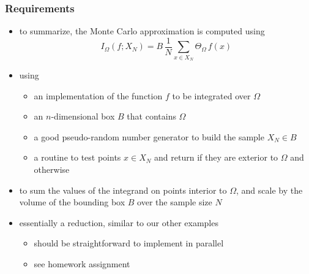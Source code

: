 \begin{frame}[fragile]
%
  \frametitle{Requirements}
%
  \begin{itemize}
%
  \item to summarize, the Monte Carlo approximation is computed using
%
    \begin{equation}
      I_{\Omega} (f; X_{N})
      =
      B \, \frac{1}{N} \sum_{x \in X_{N}} \Theta_{\Omega} \, f(x)
    \end{equation}
%
  \item using
    \begin{itemize}
    \item an implementation of the function $f$ to be integrated over $\Omega$
    \item an $n$-dimensional box $B$ that contains $\Omega$
    \item a good pseudo-random number generator to build the sample $X_{N} \in B$
    \item a routine to test points $x \in X_{N}$ and return  if they are
      exterior to $\Omega$ and  otherwise
    \end{itemize}
%
  \item to sum the values of the integrand on points interior to $\Omega$, and scale by the
    volume of the bounding box $B$ over the sample size $N$
%
  \item essentially a reduction, similar to our other examples 
    \begin{itemize}
    \item should be straightforward to implement in parallel
    \item see homework assignment
    \end{itemize}
%
  \end{itemize}
%
\end{frame}

